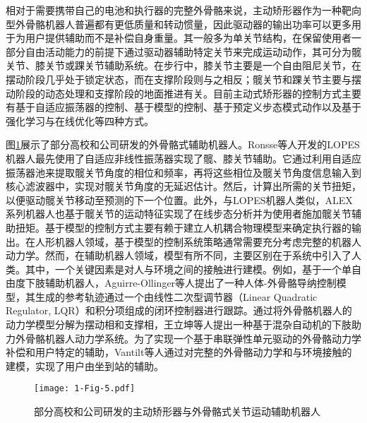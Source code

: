 相对于需要携带自己的电池和执行器的完整外骨骼来说，主动矫形器作为一种靶向型外骨骼机器人普遍都有更低质量和转动惯量，因此驱动器的输出功率可以更多用于为用户提供辅助而不是补偿自身重量\cite{collinsReducingEnergyCost2015,zhangHumanintheloopOptimizationExoskeleton2017a}。其一般多为单关节结构，在保留使用者一部分自由活动能力的前提下通过驱动器辅助特定关节来完成运动动作，其可分为髋关节、膝关节或踝关节辅助系统\cite{malcolmExperimentalStudyRole2009}。在步行中，膝关节主要是一个自由阻尼关节，在摆动阶段几乎处于锁定状态，而在支撑阶段则与之相反；髋关节和踝关节主要与摆动阶段的动态处理和支撑阶段的地面推进有关。目前主动式矫形器的控制方式主要有基于自适应振荡器的控制、基于模型的控制、基于预定义步态模式动作以及基于强化学习与在线优化等四种方式\cite{yanReviewAssistiveStrategies2015}。

图\ref{fig:1-5}展示了部分高校和公司研发的外骨骼式辅助机器人。Ronsse等人\cite{ronsseOscillatorbasedAssistanceCyclical2011c}开发的LOPES机器人最先使用了自适应非线性振荡器实现了髋、膝关节辅助。它通过利用自适应振荡器池来提取髋关节角度的相位和频率，再将这些相位及髋关节角度信息输入到核心滤波器中，实现对髋关节角度的无延迟估计。然后，计算出所需的关节扭矩，以便驱动髋关节移动至预测的下一个位置。此外，与LOPES机器人类似，ALEX系列机器人\cite{winfreeDesignMinimallyConstraining2011,stegallVariableDampingForce2017,hidayahGaitAdaptationUsing2020}也基于髋关节的运动特征实现了在线步态分析并为使用者施加髋关节辅助扭矩。基于模型的控制方式主要有赖于建立人机耦合物理模型来确定执行器的输出。在人形机器人领域，基于模型的控制系统策略通常需要充分考虑完整的机器人动力学。然而，在辅助机器人领域，模型有所不同，主要区别在于系统中引入了人类。其中，一个关键因素是对人与环境之间的接触进行建模\cite{youngStateArtFuture2017a}。例如，基于一个单自由度下肢辅助机器人，Aguirre-Ollinger等人\cite{aguirre-ollingerInertiaCompensationControl2012}提出了一种人体-外骨骼导纳控制模型，其生成的参考轨迹通过一个由线性二次型调节器（Linear Quadratic Regulator, LQR）和积分项组成的闭环控制器进行跟踪。通过将外骨骼机器人的动力学模型分解为摆动相和支撑相，王立坤等人\cite{WangXiaZhiZhuLiWaiGuGeJiQiRenKongZhiXiTongRenJiGongRongCeLueYanJiu2019}提出一种基于混杂自动机的下肢助力外骨骼机器人动力学系统。为了实现一个基于串联弹性单元驱动的外骨骼动力学补偿和用户特定的辅助，Vantilt等人\cite{vantiltModelbasedControlExoskeletons2019}通过对完整的外骨骼动力学和与环境接触的建模，实现了用户由坐到站的辅助。

\begin{figure}[h]
  \centering
  \texttt{[image: 1-Fig-5.pdf]}
  \caption{部分高校和公司研发的主动矫形器与外骨骼式关节运动辅助机器人}
  \label{fig:1-5}
\end{figure}

